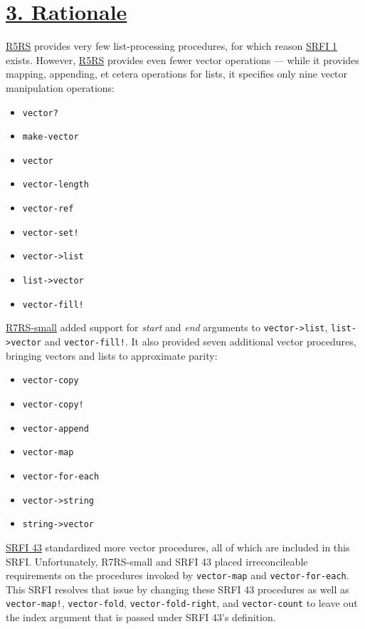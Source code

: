 \section{\texorpdfstring{\href{}{3.
Rationale}}{3. Rationale}}\label{rationale}

\protect\hyperlink{R5RS}{R5RS} provides very few list-processing
procedures, for which reason \protect\hyperlink{SRFI-1}{SRFI 1} exists.
However, \protect\hyperlink{R5RS}{R5RS} provides even fewer vector
operations --- while it provides mapping, appending, et cetera
operations for lists, it specifies only nine vector manipulation
operations:

\begin{itemize}
\tightlist
\item
  \texttt{vector?}
\item
  \texttt{make-vector}
\item
  \texttt{vector}
\item
  \texttt{vector-length}
\item
  \texttt{vector-ref}
\item
  \texttt{vector-set!}
\item
  \texttt{vector-\textgreater{}list}
\item
  \texttt{list-\textgreater{}vector}
\item
  \texttt{vector-fill!}
\end{itemize}

\protect\hyperlink{R7RS-small}{R7RS-small} added support for
\emph{start} and \emph{end} arguments to
\texttt{vector-\textgreater{}list}, \texttt{list-\textgreater{}vector}
and \texttt{vector-fill!}. It also provided seven additional vector
procedures, bringing vectors and lists to approximate parity:

\begin{itemize}
\tightlist
\item
  \texttt{vector-copy}
\item
  \texttt{vector-copy!}
\item
  \texttt{vector-append}
\item
  \texttt{vector-map}
\item
  \texttt{vector-for-each}
\item
  \texttt{vector-\textgreater{}string}
\item
  \texttt{string-\textgreater{}vector}
\end{itemize}

\protect\hyperlink{SRFI-43}{SRFI 43} standardized more vector
procedures, all of which are included in this SRFI. Unfortunately,
R7RS-small and SRFI 43 placed irreconcileable requirements on the
procedures invoked by \texttt{vector-map} and \texttt{vector-for-each}.
This SRFI resolves that issue by changing these SRFI 43 procedures as
well as \texttt{vector-map!}, \texttt{vector-fold},
\texttt{vector-fold-right}, and \texttt{vector-count} to leave out the
index argument that is passed under SRFI 43's definition.

